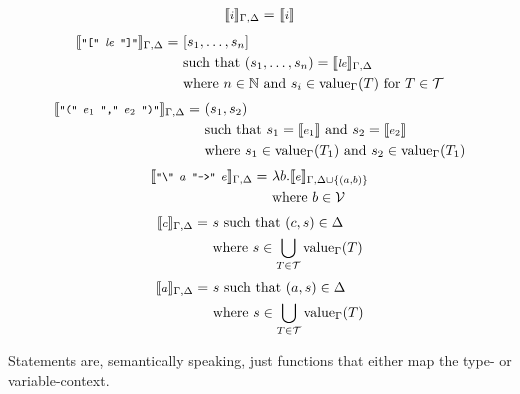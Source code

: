 \documentclass[]{scrbook}
\newcommand{\semantic}[1]{\llbracket \text{\footnotesize\texttt{#1}} \rrbracket}
\theoremstyle{definition}
\theoremstyle{definition}
\theoremstyle{definition}
\theoremstyle{remark}
\begin{document}
\[\begin{aligned}
 \end{aligned}
\] \[
\begin{aligned}
\semantic{$i$}_{\Gamma,\Delta} =\ & \semantic{$i$}\\
 \end{aligned}
\] \[
\begin{aligned}
\semantic{"[" $\mathit{le}$ "]"}_{\Gamma,\Delta} =\ & [s_1,\dots,s_n]\\
    & \text{such that }(s_1,\dots,s_n) = \semantic{$\mathit{le}$}_{\Gamma,\Delta}\\
    & \text{where }n\in\mathbb{N} \text{ and } s_i\in\text{value}_\Gamma(T) \text{ for } T\in\mathcal{T}
\end{aligned}
\] \[
\begin{aligned}
\semantic{"(" $e_1$ "," $e_2$ ")"}_{\Gamma,\Delta} =\ & (s_1,s_2)\\
    & \text{such that } s_1=\semantic{$e_1$}\text{ and } s_2=\semantic{$e_2$}\\
    & \text{where }s_1\in\text{value}_\Gamma(T_1) \text{ and } s_2\in\text{value}_\Gamma(T_1)
\end{aligned}
\] \[
\begin{aligned} 
\semantic{"\textbackslash" $a$ "->" $e$}_{\Gamma,\Delta} =\ & \lambda b. \semantic{$e$}_{\Gamma,\Delta\cup\{(a,b)\}}\\
    & \text{where } b\in\mathcal{V}
\end{aligned}
\] \[
\begin{aligned} 
\semantic{$c$}_{\Gamma,\Delta} =\ & s \text{ such that } (c,s)\in\Delta\\
    & \text{where } s\in\bigcup_{T\in\mathcal{T}}\text{value}_\Gamma(T)
\end{aligned}
\] \[
\begin{aligned} 
\semantic{$a$}_{\Gamma,\Delta} =\ & s \text{ such that } (a,s)\in\Delta\\
    & \text{where } s\in\bigcup_{T\in\mathcal{T}}\text{value}_\Gamma(T)
\end{aligned}
\]

Statements are, semantically speaking, just functions that either map
the type- or variable-context.
\end{document}
